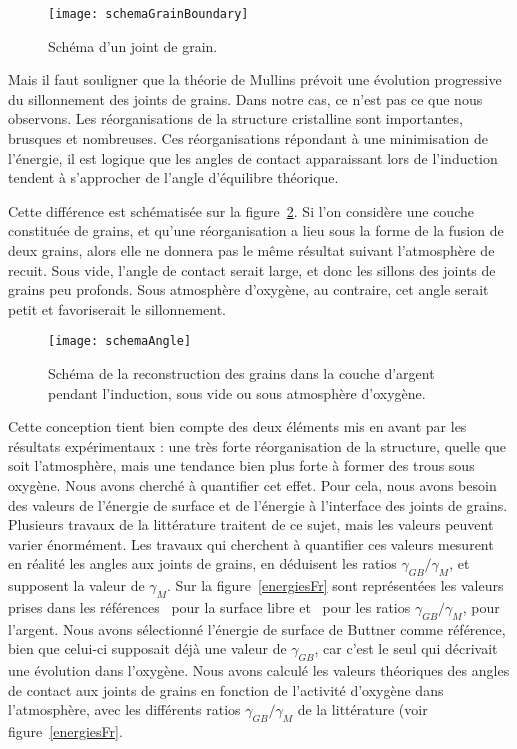 \begin{figure}[!htb]
\centering
\texttt{[image: schemaGrainBoundary]}
\caption{Schéma d’un joint de grain.}
\label{schemaGrainBoundary}
\end{figure}
Mais il faut souligner que la théorie de Mullins prévoit une évolution progressive du sillonnement des joints de grains. Dans notre cas, ce n’est pas ce que nous observons. Les réorganisations de la structure cristalline sont importantes, brusques et nombreuses. Ces réorganisations répondant à une minimisation de l’énergie, il est logique que les angles de contact apparaissant lors de l’induction tendent à s’approcher de l’angle d’équilibre théorique.\par 
Cette différence est schématisée sur la figure~\ref{schemaAngle}. Si l’on considère une couche constituée de grains, et qu’une réorganisation a lieu sous la forme de la fusion de deux grains, alors elle ne donnera pas le même résultat suivant l’atmosphère de recuit. Sous vide, l’angle de contact serait large, et donc les sillons des joints de grains peu profonds. Sous atmosphère d’oxygène, au contraire, cet angle serait petit et favoriserait le sillonnement.\par 
\begin{figure}[!htb]
\centering
\texttt{[image: schemaAngle]}
\caption{Schéma de la reconstruction des grains dans la couche d’argent pendant l’induction, sous vide ou sous atmosphère d’oxygène.}
\label{schemaAngle}
\end{figure}
Cette conception tient bien compte des deux éléments mis en avant par les résultats expérimentaux : une très forte réorganisation de la structure, quelle que soit l’atmosphère, mais une tendance bien plus forte à former des trous sous oxygène. Nous avons cherché à quantifier cet effet. Pour cela, nous avons besoin des valeurs de l’énergie de surface et de l’énergie à l’interface des joints de grains. Plusieurs travaux de la littérature traitent de ce sujet, mais les valeurs peuvent varier énormément. Les travaux qui cherchent à quantifier ces valeurs mesurent en réalité les angles aux joints de grains, en déduisent les ratios $\gamma_{GB}/\gamma_M$, et supposent la valeur de $\gamma_M$. Sur la figure~\ref{energiesFr} sont représentées les valeurs prises dans les références~\cite{buttner1952adsorption} pour la surface libre et~\cite{inman1963interfacial, fiala1975surface, kudrman1969relative} pour les ratios  $\gamma_{GB}/\gamma_M$, pour l’argent. Nous avons sélectionné l’énergie de surface de Buttner comme référence, bien que celui-ci supposait déjà une valeur de $\gamma_{GB}$, car c’est le seul qui décrivait une évolution dans l’oxygène. Nous avons calculé les valeurs théoriques des angles de contact aux joints de grains en fonction de l’activité d’oxygène dans l’atmosphère, avec les différents ratios $\gamma_{GB}/\gamma_M$ de la littérature (voir figure~\ref{energiesFr}.\par 
